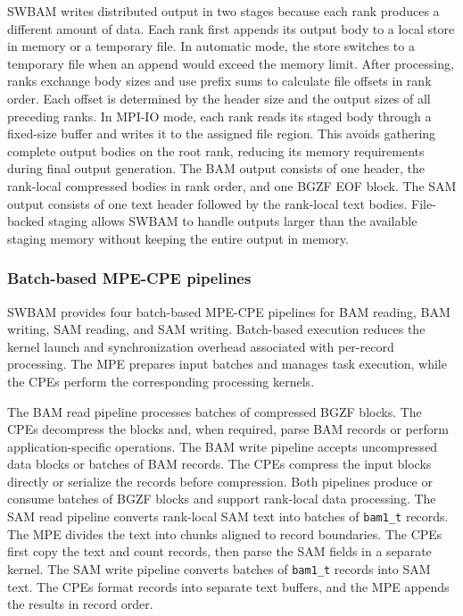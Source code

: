 \documentclass[lettersize,journal]{IEEEtran}
\begin{document}
SWBAM writes distributed output in two stages because each rank produces a different amount of data.
Each rank first appends its output body to a local store in memory or a temporary file.
In automatic mode, the store switches to a temporary file when an append would exceed the memory limit.
After processing, ranks exchange body sizes and use prefix sums to calculate file offsets in rank order.
Each offset is determined by the header size and the output sizes of all preceding ranks.
In MPI-IO mode, each rank reads its staged body through a fixed-size buffer and writes it to the assigned file region.
This avoids gathering complete output bodies on the root rank, reducing its memory requirements during final output generation.
The BAM output consists of one header, the rank-local compressed bodies in rank order, and one BGZF EOF block.
The SAM output consists of one text header followed by the rank-local text bodies.
File-backed staging allows SWBAM to handle outputs larger than the available staging memory without keeping the entire output in memory.

\subsubsection{Batch-based MPE-CPE pipelines}
SWBAM provides four batch-based MPE-CPE pipelines for BAM reading, BAM writing, SAM reading, and SAM writing.
Batch-based execution reduces the kernel launch and synchronization overhead associated with per-record processing.
The MPE prepares input batches and manages task execution, while the CPEs perform the corresponding processing kernels.

The BAM read pipeline processes batches of compressed BGZF blocks.
The CPEs decompress the blocks and, when required, parse BAM records or perform application-specific operations.
The BAM write pipeline accepts uncompressed data blocks or batches of BAM records.
The CPEs compress the input blocks directly or serialize the records before compression.
Both pipelines produce or consume batches of BGZF blocks and support rank-local data processing.
The SAM read pipeline converts rank-local SAM text into batches of \texttt{bam1\_t} records.
The MPE divides the text into chunks aligned to record boundaries.
The CPEs first copy the text and count records, then parse the SAM fields in a separate kernel.
The SAM write pipeline converts batches of \texttt{bam1\_t} records into SAM text.
The CPEs format records into separate text buffers, and the MPE appends the results in record order.
\end{document}
